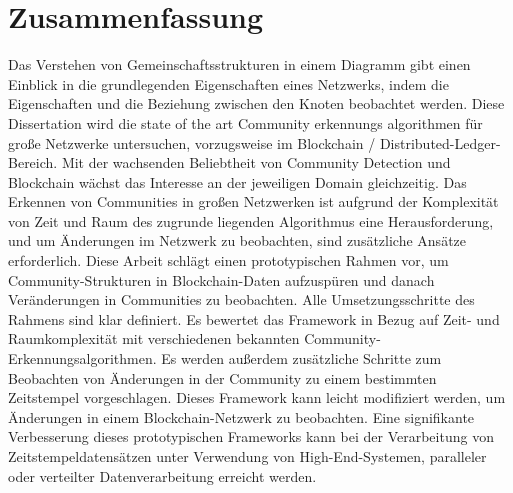 \chapter*{Zusammenfassung}
\label{cha:zusammenfassung}

Das Verstehen von Gemeinschaftsstrukturen in einem Diagramm gibt einen Einblick in die grundlegenden Eigenschaften eines Netzwerks, indem die Eigenschaften und die Beziehung zwischen den Knoten beobachtet werden. Diese Dissertation wird die state of the art Community erkennungs algorithmen für große Netzwerke untersuchen, vorzugsweise im Blockchain / Distributed-Ledger-Bereich. Mit der wachsenden Beliebtheit von Community Detection und Blockchain wächst das Interesse an der jeweiligen Domain gleichzeitig. Das Erkennen von Communities in großen Netzwerken ist aufgrund der Komplexität von Zeit und Raum des zugrunde liegenden Algorithmus eine Herausforderung, und um Änderungen im Netzwerk zu beobachten, sind zusätzliche Ansätze erforderlich. Diese Arbeit schlägt einen prototypischen Rahmen vor, um Community-Strukturen in Blockchain-Daten aufzuspüren und danach Veränderungen in Communities zu beobachten. Alle Umsetzungsschritte des Rahmens sind klar definiert. Es bewertet das Framework in Bezug auf Zeit- und Raumkomplexität mit verschiedenen bekannten Community-Erkennungsalgorithmen. Es werden außerdem zusätzliche Schritte zum Beobachten von Änderungen in der Community zu einem bestimmten Zeitstempel vorgeschlagen. Dieses Framework kann leicht modifiziert werden, um Änderungen in einem Blockchain-Netzwerk zu beobachten. Eine signifikante Verbesserung dieses prototypischen Frameworks kann bei der Verarbeitung von Zeitstempeldatensätzen unter Verwendung von High-End-Systemen, paralleler oder verteilter Datenverarbeitung erreicht werden.